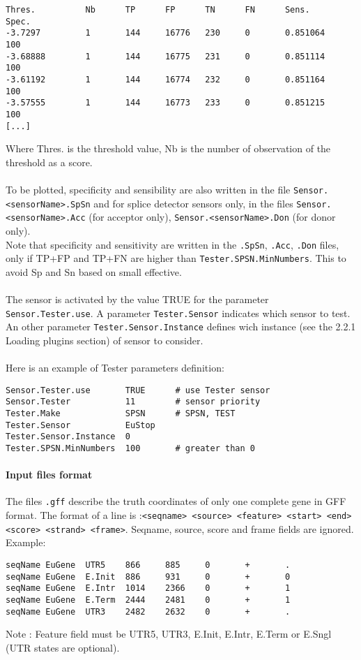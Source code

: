 \begin{Verbatim}[fontsize=\small]
Thres.          Nb      TP      FP      TN      FN      Sens.           Spec.
-3.7297         1       144     16776   230     0       0.851064        100
-3.68888        1       144     16775   231     0       0.851114        100
-3.61192        1       144     16774   232     0       0.851164        100
-3.57555        1       144     16773   233     0       0.851215        100
[...]
\end{Verbatim}
Where Thres. is the threshold value, Nb is the number of observation of the threshold as a score.\\ 
\\ 
To be plotted, specificity and sensibility are also written in the file \texttt{Sensor.<sensorName>.SpSn} and for splice detector sensors only, in the files 
\texttt{Sensor.<sensorName>.Acc} (for acceptor only), \texttt{Sensor.<sensorName>.Don} (for donor only).\\ 
Note that specificity and sensitivity are written in the \texttt{.SpSn}, \texttt{.Acc}, \texttt{.Don} files, only if TP+FP and TP+FN are higher than \texttt{Tester.SPSN.MinNumbers}. This to avoid Sp and Sn based on small effective.\\
\\
The sensor is activated by the value TRUE for the parameter
\texttt{Sensor.Tester.use}. A parameter \texttt{Tester.Sensor} indicates which sensor to test. An other parameter \texttt{Tester.Sensor.Instance} defines wich instance (see the 2.2.1 Loading plugins section) of sensor to consider.\\
\\
Here is an example of Tester parameters definition:
\begin{Verbatim}[fontsize=\small]
Sensor.Tester.use       TRUE      # use Tester sensor
Sensor.Tester           11        # sensor priority
Tester.Make             SPSN      # SPSN, TEST
Tester.Sensor           EuStop
Tester.Sensor.Instance  0
Tester.SPSN.MinNumbers  100       # greater than 0
\end{Verbatim}

\paragraph{Input files format}

The files \texttt{.gff} describe the truth coordinates of only one complete gene in GFF format. The format of a
line is :\texttt{<seqname> <source> <feature> <start> <end> <score> <strand> <frame>}. Seqname, source, score and frame fields are ignored.
Example:
\begin{Verbatim}[fontsize=\small]
seqName EuGene  UTR5    866     885     0       +       .
seqName EuGene  E.Init  886     931     0       +       0
seqName EuGene  E.Intr  1014    2366    0       +       1
seqName EuGene  E.Term  2444    2481    0       +       1
seqName EuGene  UTR3    2482    2632    0       +       .
\end{Verbatim}
Note : Feature field must be UTR5, UTR3, E.Init, E.Intr, E.Term or E.Sngl (UTR states are optional).


